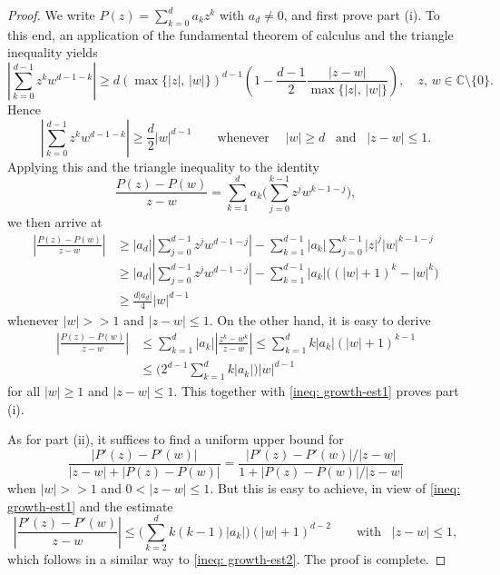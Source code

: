 \documentclass[12pt,a4paper]{amsart}
\numberwithin{equation}{section}
\theoremstyle{definition}
\begin{document}
\begin{proof} We write $P(z)=\sum_{k=0}^{d}a_kz^k$ with $a_d\neq 0$, and first prove part {\rm(i)}. To this end, an application of the fundamental theorem of calculus and the triangle inequality yields
  $$
  \left|\sum_{k=0}^{d-1} z^k w^{d-1-k} \right| \geq d \left( \max\{|z|,\, |w|\} \right)^{d-1} \left(1-\frac{d-1}{2} \frac{|z-w|} {\max\{|z|,\, |w|\}} \right),
  \quad z,\, w\in\mathbb C\!\setminus\!\{0\}.
  $$
Hence
  $$
  \left|\sum_{k=0}^{d-1} z^k w^{d-1-k} \right| \geq \frac{d}{2}|w|^{d-1}   \qquad \mbox{whenever} \quad \; |w|\geq d  \; \; \; \mbox{and}  \; \; \; |z-w|\leq 1.
  $$
Applying this and the triangle inequality to the identity
  $$
  \frac{P(z)-P(w)}{z-w} = \sum_{k=1}^{d} a_k\bigg(\sum_{j=0}^{k-1} z^j w^{k-1-j}\bigg),
  $$
we then arrive at
   \begin{equation}\label{ineq: growth-est1}
    \begin{split}
     \left|\frac{P(z)-P(w)}{z-w}\right| &\geq |a_d| \left|\sum_{j=0}^{d-1} z^j w^{d-1-j} \right| - \sum_{k=1}^{d-1} |a_k| \sum_{j=0}^{k-1} |z|^j |w|^{k-1-j}\\
     &\geq |a_d| \left|\sum_{j=0}^{d-1} z^j w^{d-1-j} \right| - \sum_{k=1}^{d-1} |a_k| \big( (|w|+1)^k-|w|^k \big) \\
     &\geq \frac{d|a_d|}{4}|w|^{d-1}
    \end{split}
   \end{equation}
whenever $|w|>>1$ and  $|z-w|\leq 1$. On the other hand, it is easy to derive
   \begin{equation}\label{ineq: growth-est2}
    \begin{split}
     \left|\frac{P(z)-P(w)}{z-w}\right|
      &\leq \sum_{k=1}^{d} |a_k| \left|\frac{z^k-w^k}{z-w}\right| \leq \sum_{k=1}^{d} k|a_k| (|w|+1)^{k-1} \\
      &\leq \bigg(2^{d-1}\sum_{k=1}^{d} k|a_k|\bigg) |w|^{d-1}
    \end{split}
   \end{equation}
for all $|w|\geq 1$ and $|z-w|\leq 1$. This together with \eqref{ineq: growth-est1} proves part {\rm(i)}.

\smallskip

  As for part {\rm(ii)}, it suffices to find a uniform upper bound for
    $$
    \frac{|P'(z)-P'(w)|}{|z-w|+|P(z)-P(w)|}=\frac{|P'(z)-P'(w)|/|z-w|}{1+|P(z)-P(w)|/|z-w|}
    $$
when $|w|>>1$ and $0<|z-w|\leq 1$. But this is easy to achieve, in view of \eqref{ineq: growth-est1} and the estimate
   $$
   \left|\frac{P'(z)-P'(w)}{z-w}\right| \leq \bigg(\sum_{k=2}^{d} k(k-1)|a_k|\bigg) (|w|+1)^{d-2}
   \qquad \mbox{with}  \; \; \; |z-w|\leq 1,
   $$
which follows in a similar way to \eqref{ineq: growth-est2}. The proof is complete.
\end{proof}
\end{document}

